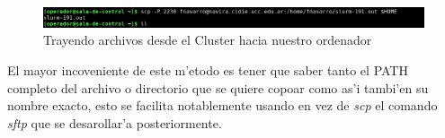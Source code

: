 \documentclass[a4paper]{scrartcl}
\begin{document}
\begin{figure}[ht]
	\includegraphics[width=\columnwidth]{./ssh_scp_sftp_imgs/StoL}
	\caption{Trayendo archivos desde el Cluster hacia nuestro ordenador}
	\label{fig:StoL}
\end{figure}

El mayor incoveniente de este m'etodo es tener que saber tanto el PATH completo del archivo o directorio que se quiere copoar como as'i tambi'en su nombre exacto, esto se facilita notablemente usando en vez de \textit{scp} el comando \textit{sftp} que se desarollar'a posteriormente.
\end{document}
